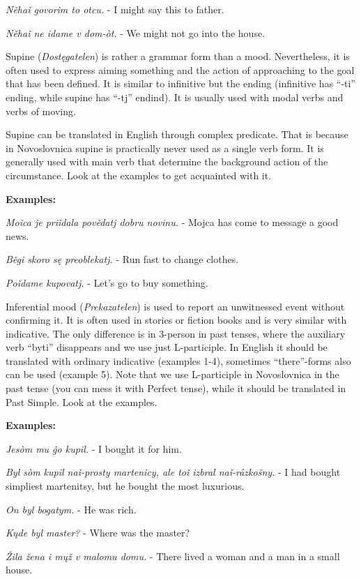 \textit{Něhaǐ govorim to otcu.} - I might say this to father.

\textit{Něhaǐ ne idame v dom-òt.} - We might not go into the house.


Supine (\textit{Dostęgatelen}) is rather a grammar form than a mood. Nevertheless, it is often used to express aiming something and the action of approaching to the goal that has been defined. It is similar to infinitive but the ending (infinitive has “-ti” ending, while supine has “-tj” endind). It is usually used with modal verbs and verbs of moving.

Supine can be translated in English through complex predicate. That is because in Novoslovnica supine is practically never used as a single verb form. It is generally used with main verb that determine the background action of the circumstance. Look at the examples to get acquainted with it.

\textbf{Examples:}

\textit{Moǐca je priǐdala povědatj dobru novinu.} - Mojca has come to message a good news.

\textit{Běgi skoro sę preoblekatj.} - Run fast to change clothes.

\textit{Poǐdame kupovatj.} - Let’s go to buy something.

Inferential mood (\textit{Prekazatelen}) is used to report an unwitnessed event without confirming it. It is often used in stories or fiction books and is very similar with indicative. The only difference is in 3-person in past tenses, where the auxiliary verb “byti” disappears and we use just L-participle. In English it should be translated with ordinary indicative (examples 1-4), sometimes “there”-forms also can be used (example 5). Note that we use L-participle in Novoslovnica in the past tense (you can mess it with Perfect tense), while it should be translated in Past Simple.
Look at the examples.

\textbf{Examples:}

\textit{Jesòm mu ĝo kupil.} - I bought it for him.

\textit{Byl sòm kupil naǐ-prosty martenicy, ale toǐ izbral naǐ-råzkošny.} - I had bought simpliest martenitsy, but he bought the most luxurious.

\textit{On byl bogatym.} - He was rich.

\textit{Kųde byl master?} - Where was the master?

\textit{Žila žena i mųž v malomu domu.} - There lived a woman and a man in a small house.
